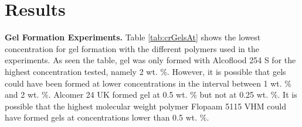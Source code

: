 \documentclass[journal = enfuem, manuscript =  article]{achemso}
\begin{document}



\section{Results}
\textbf{Gel Formation Experiments.} Table \ref{tab:crGelsAt} shows the lowest concentration for gel formation with the different polymers used in the experiments. As seen the table, gel was only formed with Alcoflood 254 S for the highest concentration tested, namely 2 wt. \%. However, it is possible that gels could have been formed at lower concentrations in the interval between 1 wt. \% and 2 wt. \%. Alcomer 24 UK formed gel at 0.5 wt. \% but not at 0.25 wt. \%. It is possible that the highest molecular weight polymer Flopaam 5115 VHM could have formed gels at concentrations lower than 0.5 wt. \%.
\end{document}
